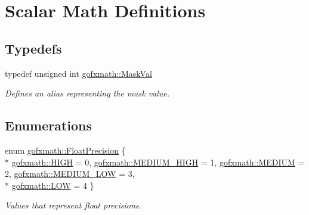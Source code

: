 \hypertarget{group___scalar_math_consts}{}\section{Scalar Math Definitions}
\label{group___scalar_math_consts}
\subsection*{Typedefs}
\begin{DoxyCompactItemize}
\item 
\hypertarget{group___scalar_math_consts_gab1b391d7995f105a3340b15c6c9d0763}{}typedef unsigned int \hyperlink{group___scalar_math_consts_gab1b391d7995f105a3340b15c6c9d0763}{gofxmath\+::\+Mask\+Val}\label{group___scalar_math_consts_gab1b391d7995f105a3340b15c6c9d0763}

\begin{DoxyCompactList}\small\item\em Defines an alias representing the mask value. \end{DoxyCompactList}\end{DoxyCompactItemize}
\subsection*{Enumerations}
\begin{DoxyCompactItemize}
\item 
enum \hyperlink{group___scalar_math_consts_ga4b1c9ff152a66c5d35b4767a57782f63}{gofxmath\+::\+Float\+Precision} \{ \\*
\hyperlink{group___scalar_math_consts_gga4b1c9ff152a66c5d35b4767a57782f63a244eee80507aa2a13170d96d214b9104}{gofxmath\+::\+H\+I\+G\+H} = 0, 
\hyperlink{group___scalar_math_consts_gga4b1c9ff152a66c5d35b4767a57782f63a8a0bf373c4216f2f3fcc42b6e80f44c2}{gofxmath\+::\+M\+E\+D\+I\+U\+M\+\_\+\+H\+I\+G\+H} = 1, 
\hyperlink{group___scalar_math_consts_gga4b1c9ff152a66c5d35b4767a57782f63a01c38b422afce79a2ddb938cf9971b76}{gofxmath\+::\+M\+E\+D\+I\+U\+M} = 2, 
\hyperlink{group___scalar_math_consts_gga4b1c9ff152a66c5d35b4767a57782f63ad7e5e2d6d083857d80ec72cb9ff9df15}{gofxmath\+::\+M\+E\+D\+I\+U\+M\+\_\+\+L\+O\+W} = 3, 
\\*
\hyperlink{group___scalar_math_consts_gga4b1c9ff152a66c5d35b4767a57782f63a9db1590eafa097de6665238345fdf63e}{gofxmath\+::\+L\+O\+W} = 4
 \}
\begin{DoxyCompactList}\small\item\em Values that represent float precisions. \end{DoxyCompactList}\end{DoxyCompactItemize}
